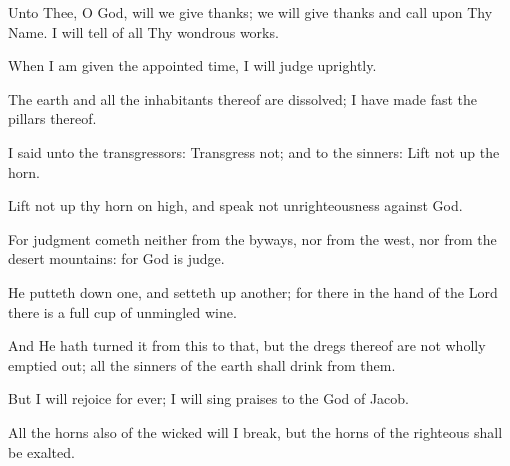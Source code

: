Unto Thee, O God, will we give thanks; we will give thanks and call upon Thy Name. I will tell of all Thy wondrous works.

When I am given the appointed time, I will judge uprightly.

The earth and all the inhabitants thereof are dissolved; I have made fast the pillars thereof.

I said unto the transgressors: Transgress not; and to the sinners: Lift not up the horn.

Lift not up thy horn on high, and speak not unrighteousness against God.

For judgment cometh neither from the byways, nor from the west, nor from the desert mountains: for God is judge.

He putteth down one, and setteth up another; for there in the hand of the Lord there is a full cup of unmingled wine.

And He hath turned it from this to that, but the dregs thereof are not wholly emptied out; all the sinners of the earth shall drink from them.

But I will rejoice for ever; I will sing praises to the God of Jacob.

All the horns also of the wicked will I break, but the horns of the righteous shall be exalted.
